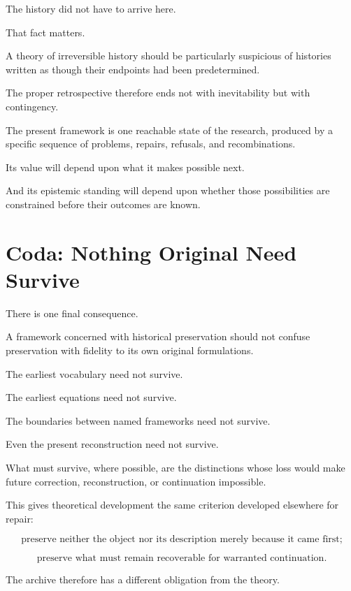 \documentclass[11pt]{article}
\theoremstyle{remark}
\begin{document}
The history did not have to arrive here.

That fact matters.

A theory of irreversible history should be particularly suspicious of histories
written as though their endpoints had been predetermined.

The proper retrospective therefore ends not with inevitability but with
contingency.

The present framework is one reachable state of the research, produced by a
specific sequence of problems, repairs, refusals, and recombinations.

Its value will depend upon what it makes possible next.

And its epistemic standing will depend upon whether those possibilities are
constrained before their outcomes are known.


\section*{Coda: Nothing Original Need Survive}

There is one final consequence.

A framework concerned with historical preservation should not confuse
preservation with fidelity to its own original formulations.

The earliest vocabulary need not survive.

The earliest equations need not survive.

The boundaries between named frameworks need not survive.

Even the present reconstruction need not survive.

What must survive, where possible, are the distinctions whose loss would make
future correction, reconstruction, or continuation impossible.

This gives theoretical development the same criterion developed elsewhere for
repair:

\begin{equation}
\text{preserve neither the object nor its description merely because it came
first;}
\end{equation}

\begin{equation}
\boxed{
\text{preserve what must remain recoverable for warranted continuation.}
}
\end{equation}

The archive therefore has a different obligation from the theory.
\end{document}
